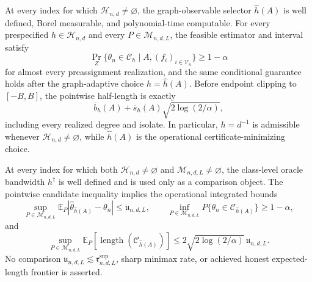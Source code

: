 At every index for which \(\mathcal H_{n,d}\ne\varnothing\), the graph-observable selector \(\widehat h(A)\) is well defined, Borel measurable, and polynomial-time computable.  For every prespecified \(h\in\mathcal H_{n,d}\) and every \(P\in\mathcal M_{n,d,L}\), the feasible estimator and interval satisfy
\[
 \Pr_Z\{\theta_n\in\mathcal C_h\mid A,(f_i)_{i\in\mathcal V_n}\}\geq1-\alpha
\]
for almost every preassignment realization, and the same conditional guarantee holds after the graph-adaptive choice \(h=\widehat h(A)\).  Before endpoint clipping to \([-B,B]\), the pointwise half-length is exactly
\[
 \overline b_h(A)+\overline s_h(A)\sqrt{2\log(2/\alpha)},
\]
including every realized degree and isolate.  In particular, \(h=d^{-1}\) is admissible whenever \(\mathcal H_{n,d}\ne\varnothing\), while \(\widehat h(A)\) is the operational certificate-minimizing choice.

At every index for which both \(\mathcal H_{n,d}\ne\varnothing\) and \(\mathcal M_{n,d,L}\ne\varnothing\), the class-level oracle bandwidth \(h^\dagger\) is well defined and is used only as a comparison object.  The pointwise candidate inequality implies the operational integrated bounds
\[
 \sup_{P\in\mathcal M_{n,d,L}}
 \mathbb E_P|\widehat\theta_{\widehat h(A)}-\theta_n|
 \leq\mathfrak u_{n,d,L},
 \qquad
 \inf_{P\in\mathcal M_{n,d,L}}
 P\{\theta_n\in\mathcal C_{\widehat h(A)}\}\geq1-\alpha,
\]
and
\[
 \sup_{P\in\mathcal M_{n,d,L}}
 \mathbb E_P[\operatorname{length}(\mathcal C_{\widehat h(A)})]
 \leq2\sqrt{2\log(2/\alpha)}\,\mathfrak u_{n,d,L}.
\]
No comparison \(\mathfrak u_{n,d,L}\lesssim\mathfrak r^{\mathrm{sup}}_{n,d,L}\), sharp minimax rate, or achieved honest expected-length frontier is asserted.